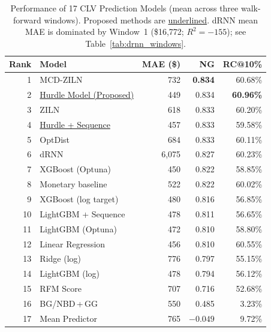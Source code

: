 \documentclass[pdflatex,sn-mathphys-num]{sn-jnl}
\theoremstyle{thmstyleone}
\theoremstyle{thmstyletwo}
\theoremstyle{thmstylethree}
\begin{document}
\begin{table}[h]
\caption{Performance of 17 CLV Prediction Models (mean across three
walk-forward windows). Proposed methods are \underline{underlined}.
dRNN mean MAE is dominated by Window~1 (\$16{,}772; $R^2{=}{-}155$);
see Table~\ref{tab:drnn_windows}.}
\label{tab:main}
\footnotesize
\begin{tabular*}{\columnwidth}{@{\extracolsep\fill}rlrrr@{}}
\toprule
\textbf{Rank} & \textbf{Model} & \textbf{MAE (\$)} & \textbf{NG} &
\textbf{RC@10\%} \\
\midrule
1 & MCD-ZILN~\cite{mcd2024clv}              & 732 & \textbf{0.834} & 60.68\% \\
2 & \underline{Hurdle Model (Proposed)}     & 449 & 0.834 & \textbf{60.96\%} \\
3 & ZILN~\cite{wang2019deep}                & 618 & 0.833 & 60.20\% \\
4 & \underline{Hurdle + Sequence}           & 457 & 0.833 & 59.58\% \\
5 & OptDist~\cite{tang2024optdist}          & 684 & 0.833 & 60.11\% \\
6 & dRNN~\cite{meta2024drnn}                & 6{,}075 & 0.827 & 60.23\% \\
7 & XGBoost (Optuna)                        & 450 & 0.822 & 58.85\% \\
8 & Monetary baseline                       & 522 & 0.822 & 60.02\% \\
9 & XGBoost (log target)                    & 480 & 0.816 & 56.85\% \\
10 & LightGBM + Sequence                    & 478 & 0.811 & 56.65\% \\
11 & LightGBM (Optuna)                      & 472 & 0.810 & 58.80\% \\
12 & Linear Regression                      & 456 & 0.810 & 60.55\% \\
13 & Ridge (log)                            & 776 & 0.797 & 55.15\% \\
14 & LightGBM (log)                         & 478 & 0.794 & 56.12\% \\
15 & RFM Score                              & 707 & 0.716 & 52.68\% \\
16 & BG/NBD\,+\,GG~\cite{fader2005counting,fader2013gammagamma}    & 550 & 0.485 & 3.23\%  \\
17 & Mean Predictor                         & 765 & $-0.049$ & 9.72\% \\
\bottomrule
\end{tabular*}
\end{table}
\end{document}
